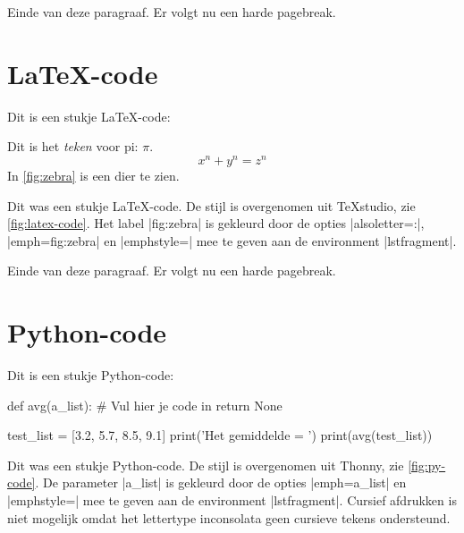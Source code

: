 \begin{llstShortInline}

Einde van deze paragraaf. 
Er volgt nu een harde pagebreak.

\clearpage
\section{\texorpdfstring{\LaTeX{}-code}{LaTeX-code}}
Dit is een stukje \LaTeX{}-code:
\begin{lstfragment}[style=lstyle, alsoletter=:, emph=fig:zebra, emphstyle=\lstllabel]
\newcommand{\myClass}{article}



	Dit is het \emph{teken} voor pi: $\pi$.
	\[ x^n + y^n = z^n \]
	In \cref{fig:zebra} is een dier te zien. 

\end{lstfragment}

Dit was een stukje \LaTeX{}-code. 
De stijl is overgenomen uit TeXstudio, zie \cref{fig:latex-code}.
Het label {\lstllabel|fig:zebra|} is gekleurd door de opties |alsoletter=:|, |emph=fig:zebra| en |emphstyle=\lstllabel| mee te geven aan de environment |lstfragment|.


Einde van deze paragraaf. 
Er volgt nu een harde pagebreak.

\clearpage
\section{Python-code}
Dit is een stukje Python-code:
\begin{lstfragment}[style=pystyle, emph=a_list, emphstyle=\color{lstdarkerblue}]
def avg(a_list):
	# Vul hier je code in
	return None

test_list = [3.2, 5.7, 8.5, 9.1]
print('Het gemiddelde = ')
print(avg(test_list))
\end{lstfragment}
Dit was een stukje Python-code. 
De stijl is overgenomen uit Thonny, zie \cref{fig:py-code}.
De parameter {\color{lstdarkerblue}|a_list|} is gekleurd door de opties |emph=a_list| en |emphstyle=\color{lstdarkerblue}| mee te geven aan de environment |lstfragment|.
Cursief afdrukken is niet mogelijk omdat het lettertype inconsolata geen cursieve tekens ondersteund.



\end{llstShortInline}
